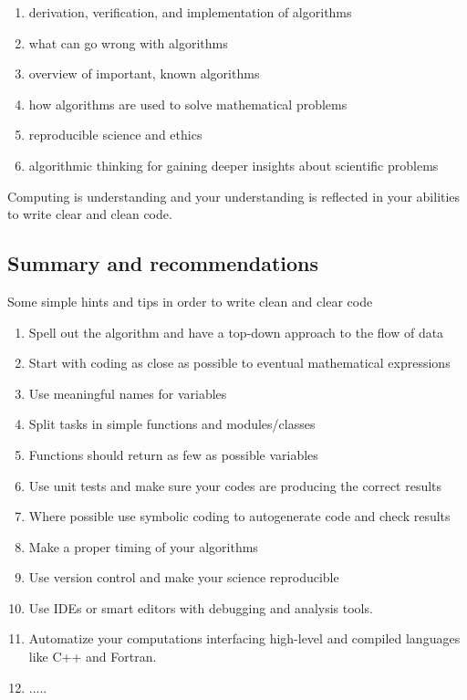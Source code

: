 \documentclass[%
oneside,                 %
final,                   %
10pt]{article}
\begin{document}
\begin{enumerate}
\item derivation, verification, and implementation of algorithms

\item what can go wrong with algorithms

\item overview of important, known algorithms

\item how algorithms are used to solve mathematical problems

\item reproducible science and ethics

\item algorithmic thinking for gaining deeper insights about scientific problems
\end{enumerate}

\noindent
Computing is understanding and your understanding is reflected in your abilities to
write clear and clean code.

\subsection*{Summary and recommendations}
Some simple hints and tips in order to write clean and clear code
\begin{enumerate}
\item Spell out the algorithm and have a top-down approach to the flow of data

\item Start with coding as close as possible to eventual mathematical expressions

\item Use meaningful names for variables

\item Split tasks in simple functions and modules/classes

\item Functions should return as few as possible variables

\item Use unit tests and make sure your codes are producing the correct results

\item Where possible use symbolic coding to autogenerate code and check results

\item Make a proper timing of your algorithms

\item Use version control and make your science reproducible

\item Use IDEs or smart editors with debugging and analysis tools.

\item Automatize your computations interfacing high-level and compiled languages like C++ and Fortran.

\item .....
\end{enumerate}
\end{document}
